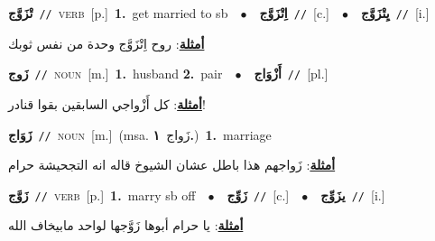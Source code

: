 \documentclass[10pt,a4paper,twoside]{article} %
\begin{document}
\begin{multicols}{2}
{\setlength\topsep{0pt}\textbf{\foreignlanguage{arabic}{تْزَوَّج}}\ {\color{gray}\texttt{//}\color{black}}\ \textsc{verb}\ [p.]\ \textbf{1.}~get married to sb\ \ $\bullet$\ \ \setlength\topsep{0pt}\textbf{\foreignlanguage{arabic}{اِتْزَوَّج}}\ {\color{gray}\texttt{//}\color{black}}\ [c.]\ \ $\bullet$\ \ \setlength\topsep{0pt}\textbf{\foreignlanguage{arabic}{يِتْزَوَّج}}\ {\color{gray}\texttt{//}\color{black}}\ [i.]\  \begin{flushright}\color{gray}\foreignlanguage{arabic}{\textbf{\underline{\foreignlanguage{arabic}{أمثلة}}}: روح اِتْزَوَّج وحدة من نفس ثوبك}\end{flushright}\color{black}} \vspace{2mm}

{\setlength\topsep{0pt}\textbf{\foreignlanguage{arabic}{زَوج}}\ {\color{gray}\texttt{//}\color{black}}\ \textsc{noun}\ [m.]\ \textbf{1.}~husband  \textbf{2.}~pair\ \ $\bullet$\ \ \setlength\topsep{0pt}\textbf{\foreignlanguage{arabic}{أَزْوَاج}}\ {\color{gray}\texttt{//}\color{black}}\ [pl.]\  \begin{flushright}\color{gray}\foreignlanguage{arabic}{\textbf{\underline{\foreignlanguage{arabic}{أمثلة}}}: كل أَزْواجي السابقين بقوا قنادر!}\end{flushright}\color{black}} \vspace{2mm}

{\setlength\topsep{0pt}\textbf{\foreignlanguage{arabic}{زَوَاج}}\ {\color{gray}\texttt{//}\color{black}}\ \textsc{noun}\ [m.]\ \color{gray}(msa. \foreignlanguage{arabic}{زَواج}~\foreignlanguage{arabic}{\textbf{١.}})\color{black}\ \textbf{1.}~marriage\  \begin{flushright}\color{gray}\foreignlanguage{arabic}{\textbf{\underline{\foreignlanguage{arabic}{أمثلة}}}: زَواجهم هذا باطل عشان الشيوخ قاله انه التجحيشة حرام}\end{flushright}\color{black}} \vspace{2mm}

{\setlength\topsep{0pt}\textbf{\foreignlanguage{arabic}{زَوَّج}}\ {\color{gray}\texttt{//}\color{black}}\ \textsc{verb}\ [p.]\ \textbf{1.}~marry sb off\ \ $\bullet$\ \ \setlength\topsep{0pt}\textbf{\foreignlanguage{arabic}{زَوِّج}}\ {\color{gray}\texttt{//}\color{black}}\ [c.]\ \ $\bullet$\ \ \setlength\topsep{0pt}\textbf{\foreignlanguage{arabic}{يزَوِّج}}\ {\color{gray}\texttt{//}\color{black}}\ [i.]\  \begin{flushright}\color{gray}\foreignlanguage{arabic}{\textbf{\underline{\foreignlanguage{arabic}{أمثلة}}}: يا حرام أبوها زَوَّجها لواحد مابيخاف الله}\end{flushright}\color{black}} \vspace{2mm}


\end{multicols}
\end{document}
